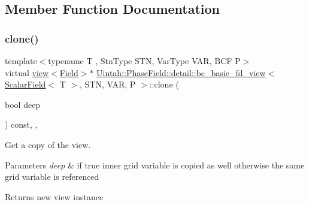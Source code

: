 \subsection{Member Function Documentation}
\mbox{\label{classUintah_1_1PhaseField_1_1detail_1_1bc__basic__fd__view_3_01ScalarField_3_01T_01_4_00_01STN_00_01VAR_00_01P_01_4_aefe3932d2c0c72fe420417f7291b4c15}} 
\subsubsection{\texorpdfstring{clone()}{clone()}\hspace{0.1cm}{\footnotesize\ttfamily [1/2]}}
{\footnotesize\ttfamily template$<$typename T , Stn\+Type S\+TN, Var\+Type V\+AR, B\+CF P$>$ \\
virtual \hyperlink{classUintah_1_1PhaseField_1_1detail_1_1view}{view}$<$\hyperlink{structUintah_1_1PhaseField_1_1ScalarField}{Field}$>$$\ast$ \hyperlink{classUintah_1_1PhaseField_1_1detail_1_1bc__basic__fd__view}{Uintah\+::\+Phase\+Field\+::detail\+::bc\+\_\+basic\+\_\+fd\+\_\+view}$<$ \hyperlink{structUintah_1_1PhaseField_1_1ScalarField}{Scalar\+Field}$<$ T $>$, S\+TN, V\+AR, P $>$\+::clone (\begin{DoxyParamCaption}\item[{bool}]{deep }\end{DoxyParamCaption}) const\hspace{0.3cm}{\ttfamily [inline]}, {\ttfamily [override]}, {\ttfamily [virtual]}}



Get a copy of the view. 


\begin{DoxyParams}{Parameters}
{\em deep} & if true inner grid variable is copied as well otherwise the same grid variable is referenced\\
\hline
\end{DoxyParams}
\begin{DoxyReturn}{Returns}
new view instance 
\end{DoxyReturn}


